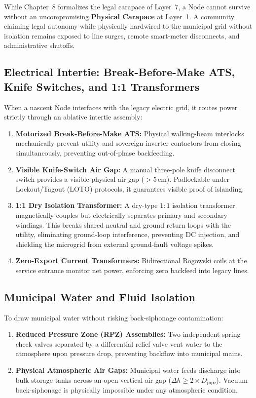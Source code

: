 While Chapter~8 formalizes the legal carapace of Layer~7, a Node cannot survive without an uncompromising \textbf{Physical Carapace} at Layer~1. A community claiming legal autonomy while physically hardwired to the municipal grid without isolation remains exposed to line surges, remote smart-meter disconnects, and administrative shutoffs.

\subsection{Electrical Intertie: Break-Before-Make ATS, Knife Switches, and 1:1 Transformers}

When a nascent Node interfaces with the legacy electric grid, it routes power strictly through an ablative intertie assembly:
\begin{enumerate}
    \item \textbf{Motorized Break-Before-Make ATS:} Physical walking-beam interlocks mechanically prevent utility and sovereign inverter contactors from closing simultaneously, preventing out-of-phase backfeeding.
    \item \textbf{Visible Knife-Switch Air Gap:} A manual three-pole knife disconnect switch provides a visible physical air gap ($>5\,\mathrm{cm}$). Padlockable under Lockout/Tagout (LOTO) protocols, it guarantees visible proof of islanding.
    \item \textbf{1:1 Dry Isolation Transformer:} A dry-type $1:1$ isolation transformer magnetically couples but electrically separates primary and secondary windings. This breaks shared neutral and ground return loops with the utility, eliminating ground-loop interference, preventing DC injection, and shielding the microgrid from external ground-fault voltage spikes.
    \item \textbf{Zero-Export Current Transformers:} Bidirectional Rogowski coils at the service entrance monitor net power, enforcing zero backfeed into legacy lines.
\end{enumerate}

\subsection{Municipal Water and Fluid Isolation}

To draw municipal water without risking back-siphonage contamination:
\begin{enumerate}
    \item \textbf{Reduced Pressure Zone (RPZ) Assemblies:} Two independent spring check valves separated by a differential relief valve vent water to the atmosphere upon pressure drop, preventing backflow into municipal mains.
    \item \textbf{Physical Atmospheric Air Gaps:} Municipal water feeds discharge into bulk storage tanks across an open vertical air gap ($\Delta h \ge 2 \times D_{\mathrm{pipe}}$). Vacuum back-siphonage is physically impossible under any atmospheric condition.
\end{enumerate}


